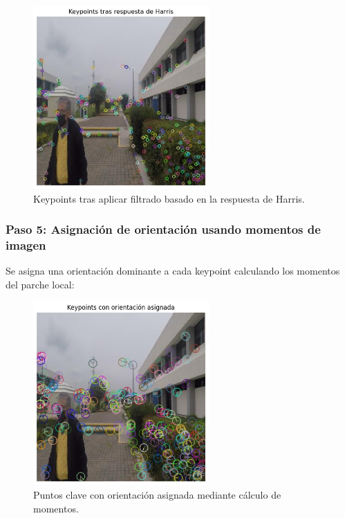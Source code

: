 \documentclass[a4paper]{article}
\begin{document}
\begin{figure}[H]
    \centering
    \includegraphics[width=0.6\textwidth]{images/harris_response.jpg}
    \caption{Keypoints tras aplicar filtrado basado en la respuesta de Harris.}
\end{figure}

\subsubsection*{Paso 5: Asignación de orientación usando momentos de imagen}

Se asigna una orientación dominante a cada keypoint calculando los momentos del parche local:

\begin{figure}[H]
    \centering
    \includegraphics[width=0.6\textwidth]{images/keypoints_orientacion.jpg}
    \caption{Puntos clave con orientación asignada mediante cálculo de momentos.}
\end{figure}
\end{document}
